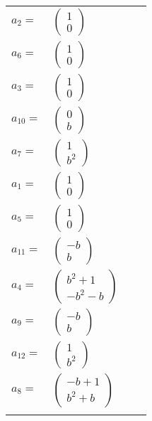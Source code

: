\documentclass[1p]{elsarticle_modified}
\theoremstyle{definition}
\begin{document}
\begin{tabular}{m{7pt} m{180pt} m{7pt} m{180pt} }
\flushright $a_{2}=$&$\begin{pmatrix}1\\0\end{pmatrix}$ \\
\flushright $a_{6}=$&$\begin{pmatrix}1\\0\end{pmatrix}$ \\
\flushright $a_{3}=$&$\begin{pmatrix}1\\0\end{pmatrix}$ \\
\flushright $a_{10}=$&$\begin{pmatrix}0\\b\end{pmatrix}$ \\
\flushright $a_{7}=$&$\begin{pmatrix}1\\b^2\end{pmatrix}$ \\
\flushright $a_{1}=$&$\begin{pmatrix}1\\0\end{pmatrix}$ \\
\flushright $a_{5}=$&$\begin{pmatrix}1\\0\end{pmatrix}$ \\
\flushright $a_{11}=$&$\begin{pmatrix}- b\\b\end{pmatrix}$ \\
\flushright $a_{4}=$&$\begin{pmatrix}b^2+1\\- b^2- b\end{pmatrix}$ \\
\flushright $a_{9}=$&$\begin{pmatrix}- b\\b\end{pmatrix}$ \\
\flushright $a_{12}=$&$\begin{pmatrix}1\\b^2\end{pmatrix}$ \\
\flushright $a_{8}=$&$\begin{pmatrix}- b+1\\b^2+b\end{pmatrix}$\\&\end{tabular}
\end{document}
